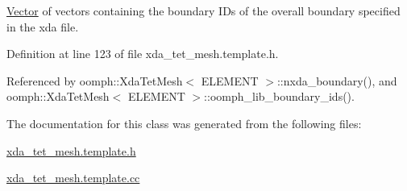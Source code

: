 \hyperlink{classoomph_1_1Vector}{Vector} of vectors containing the boundary I\+Ds of the overall boundary specified in the xda file. 



Definition at line 123 of file xda\+\_\+tet\+\_\+mesh.\+template.\+h.



Referenced by oomph\+::\+Xda\+Tet\+Mesh$<$ E\+L\+E\+M\+E\+N\+T $>$\+::nxda\+\_\+boundary(), and oomph\+::\+Xda\+Tet\+Mesh$<$ E\+L\+E\+M\+E\+N\+T $>$\+::oomph\+\_\+lib\+\_\+boundary\+\_\+ids().



The documentation for this class was generated from the following files\+:\begin{DoxyCompactItemize}
\item 
\hyperlink{xda__tet__mesh_8template_8h}{xda\+\_\+tet\+\_\+mesh.\+template.\+h}\item 
\hyperlink{xda__tet__mesh_8template_8cc}{xda\+\_\+tet\+\_\+mesh.\+template.\+cc}\end{DoxyCompactItemize}
